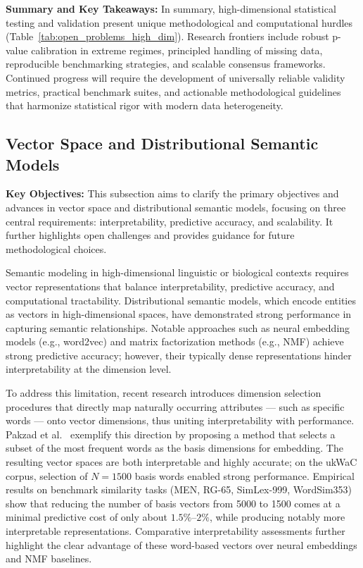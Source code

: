 \documentclass[sigconf]{acmart}
\begin{document}
\noindent
\textbf{Summary and Key Takeaways:} In summary, high-dimensional statistical testing and validation present unique methodological and computational hurdles (Table~\ref{tab:open_problems_high_dim}). Research frontiers include robust p-value calibration in extreme regimes, principled handling of missing data, reproducible benchmarking strategies, and scalable consensus frameworks. Continued progress will require the development of universally reliable validity metrics, practical benchmark suites, and actionable methodological guidelines that harmonize statistical rigor with modern data heterogeneity.

\subsection{Vector Space and Distributional Semantic Models}

\textbf{Key Objectives:} This subsection aims to clarify the primary objectives and advances in vector space and distributional semantic models, focusing on three central requirements: interpretability, predictive accuracy, and scalability. It further highlights open challenges and provides guidance for future methodological choices.

Semantic modeling in high-dimensional linguistic or biological contexts requires vector representations that balance interpretability, predictive accuracy, and computational tractability. Distributional semantic models, which encode entities as vectors in high-dimensional spaces, have demonstrated strong performance in capturing semantic relationships. Notable approaches such as neural embedding models (e.g., word2vec) and matrix factorization methods (e.g., NMF) achieve strong predictive accuracy; however, their typically dense representations hinder interpretability at the dimension level.

To address this limitation, recent research introduces dimension selection procedures that directly map naturally occurring attributes — such as specific words — onto vector dimensions, thus uniting interpretability with performance. Pakzad et al.~\cite{ref115} exemplify this direction by proposing a method that selects a subset of the most frequent words as the basis dimensions for embedding. The resulting vector spaces are both interpretable and highly accurate; on the ukWaC corpus, selection of $N=1500$ basis words enabled strong performance. Empirical results on benchmark similarity tasks (MEN, RG-65, SimLex-999, WordSim353) show that reducing the number of basis vectors from 5000 to 1500 comes at a minimal predictive cost of only about $1.5\%$–$2\%$, while producing notably more interpretable representations. Comparative interpretability assessments further highlight the clear advantage of these word-based vectors over neural embeddings and NMF baselines.
\end{document}
